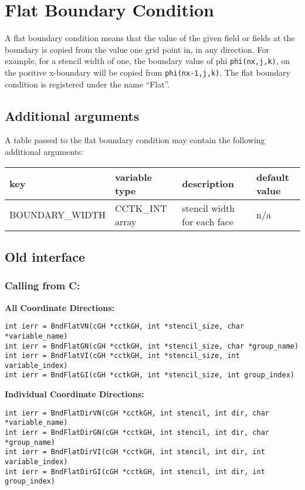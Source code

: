 \documentclass{article}
\begin{document}
\section{Flat Boundary Condition}

A flat boundary condition means that the value of the given 
field or fields at the boundary is copied from the value one grid point in,
in any direction. For example, for a stencil width of one, the
boundary value of phi {\tt phi(nx,j,k)}, on the positive x-boundary will
be copied from {\tt phi(nx-1,j,k)}.  The flat boundary condition is registered under the name ``Flat''.

\subsection{Additional arguments}

A table passed to the flat boundary condition may contain the
following additional arguments:\\[1mm]
\begin{tabular}{|l|l|l|l|}
\hline
\textbf{key} & \textbf{variable type} & \textbf{description} & \textbf{default value}\\
\hline
BOUNDARY\_WIDTH & CCTK\_INT array & stencil width for each face & n/a\\
\hline
\end{tabular}

\subsection{Old interface}

\subsubsection*{Calling from C:}

{\bf All Coordinate Directions:}
\begin{verbatim}
int ierr = BndFlatVN(cGH *cctkGH, int *stencil_size, char *variable_name)
int ierr = BndFlatGN(cGH *cctkGH, int *stencil_size, char *group_name)
int ierr = BndFlatVI(cGH *cctkGH, int *stencil_size, int variable_index)
int ierr = BndFlatGI(cGH *cctkGH, int *stencil_size, int group_index)
\end{verbatim}

\noindent
{\bf Individual Coordinate Directions:}
\begin{verbatim}
int ierr = BndFlatDirVN(cGH *cctkGH, int stencil, int dir, char *variable_name)
int ierr = BndFlatDirGN(cGH *cctkGH, int stencil, int dir, char *group_name)
int ierr = BndFlatDirVI(cGH *cctkGH, int stencil, int dir, int variable_index)
int ierr = BndFlatDirGI(cGH *cctkGH, int stencil, int dir, int group_index)
\end{verbatim}
\end{document}
